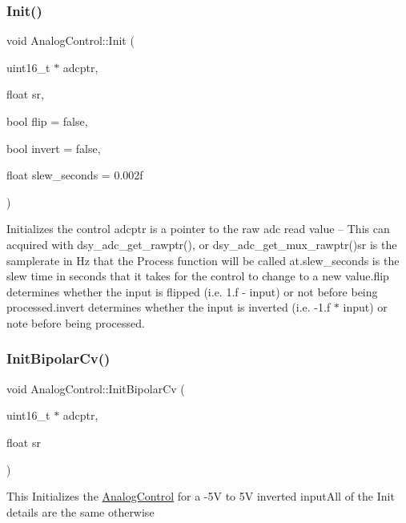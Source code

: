 \subsubsection{\texorpdfstring{Init()}{Init()}}
{\footnotesize\ttfamily void Analog\+Control\+::\+Init (\begin{DoxyParamCaption}\item[{uint16\+\_\+t $\ast$}]{adcptr,  }\item[{float}]{sr,  }\item[{bool}]{flip = {\ttfamily false},  }\item[{bool}]{invert = {\ttfamily false},  }\item[{float}]{slew\+\_\+seconds = {\ttfamily 0.002f} }\end{DoxyParamCaption})}

Initializes the control adcptr is a pointer to the raw adc read value -- This can acquired with dsy\+\_\+adc\+\_\+get\+\_\+rawptr(), or dsy\+\_\+adc\+\_\+get\+\_\+mux\+\_\+rawptr()sr is the samplerate in Hz that the Process function will be called at.\+slew\+\_\+seconds is the slew time in seconds that it takes for the control to change to a new value.\+flip determines whether the input is flipped (i.\+e. 1.\+f -\/ input) or not before being processed.\+invert determines whether the input is inverted (i.\+e. -\/1.\+f $\ast$ input) or note before being processed. \mbox{\label{classdaisy_1_1_analog_control_a9b24917746fa0a7e63bd0c1d3079c8a0}} 
\subsubsection{\texorpdfstring{Init\+Bipolar\+Cv()}{InitBipolarCv()}}
{\footnotesize\ttfamily void Analog\+Control\+::\+Init\+Bipolar\+Cv (\begin{DoxyParamCaption}\item[{uint16\+\_\+t $\ast$}]{adcptr,  }\item[{float}]{sr }\end{DoxyParamCaption})}

This Initializes the \hyperlink{classdaisy_1_1_analog_control}{Analog\+Control} for a -\/5V to 5V inverted input\+All of the Init details are the same otherwise \mbox{\label{classdaisy_1_1_analog_control_ab21a770e710eabe33839c03ea24552d3}} 
